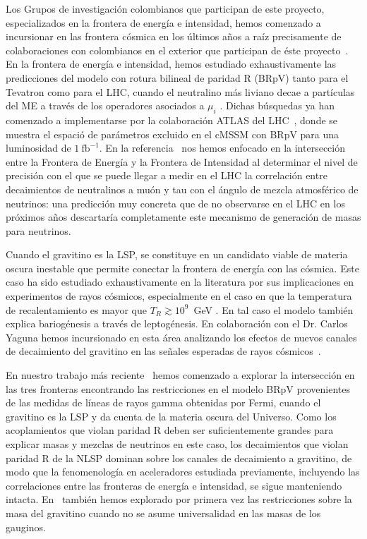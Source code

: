 Los Grupos de investigación colombianos que participan de este
proyecto, especializados en la frontera de energía e intensidad,
hemos comenzado a incursionar en las frontera cósmica en los últimos
años a raíz precisamente de colaboraciones con colombianos en el
exterior que participan de éste
proyecto~\cite{Sierra:2008wj,Sierra:2009zq,Choi:2010jt}. En la
frontera de energía e intensidad, hemos estudiado exhaustivamente las
predicciones del modelo con rotura bilineal de paridad R (BRpV) tanto
para el Tevatron como para el LHC, cuando el neutralino más liviano
decae a partículas del ME a través de los operadores asociados a
$\mu_i$
\cite{Magro:2003zb,deCampos:2005ri,deCampos:2007bn,deCampos:2008ic,deCampos:2008re,DeCampos:2010yu}. Dichas
búsquedas ya han comenzado a implementarse por la colaboración ATLAS
del LHC~\cite{:2011iu}, donde se muestra el espació de parámetros
excluido en el cMSSM con BRpV para una luminosidad de $1\
\text{fb}^{-1}$.  En la referencia~\cite{DeCampos:2010yu} nos hemos
enfocado en la intersección entre la Frontera de Energía y la Frontera
de Intensidad al determinar el nivel de precisión con el que se puede
llegar a medir en el LHC la correlación entre decaimientos de
neutralinos a muón y tau con el ángulo de mezcla atmosférico de
neutrinos: una predicción muy concreta que de no observarse en el LHC
en los próximos años descartaría completamente este mecanismo de
generación de masas para neutrinos.

Cuando el gravitino es la LSP, se constituye en un candidato viable de
materia oscura inestable que permite conectar la frontera de energía
con las cósmica. Este caso ha sido estudiado exhaustivamente en la
literatura por sus implicaciones en experimentos de rayos cósmicos,
especialmente en el caso en que la temperatura de recalentamiento es
mayor que $T_R\gtrsim 10^9$~GeV
\cite{Takayama:2000uz,Buchmuller:2007ui,Bertone:2007aw,Ibarra:2007wg,Ishiwata:2008cu,Covi:2008jy,Ibarra:2008qg}.
En tal caso el modelo también explica bariogénesis a través de
leptogénesis. En colaboración con el Dr. Carlos Yaguna hemos
incursionado en esta área analizando los efectos de nuevos canales de
decaimiento del gravitino en las señales esperadas de rayos
cósmicos~\cite{Choi:2010jt}.

En nuestro trabajo más reciente~\cite{Restrepo:2011rj} hemos comenzado a
explorar la intersección en las tres fronteras
encontrando las restricciones en el modelo BRpV provenientes de las
medidas de líneas de rayos gamma obtenidas por Fermi, cuando el
gravitino es la LSP y da cuenta de la
materia oscura del Universo. Como los acoplamientos que violan paridad
R deben ser suficientemente grandes para explicar masas y mezclas de
neutrinos en este caso, los decaimientos que violan paridad R de la
NLSP dominan
sobre los canales de decaimiento a gravitino, de modo que la
fenomenología en aceleradores estudiada previamente, incluyendo las correlaciones entre las
fronteras de energía e intensidad, se sigue
manteniendo intacta. En~\cite{Restrepo:2011rj} también hemos explorado
por primera vez las restricciones sobre la masa del gravitino cuando
no se asume universalidad en las masas de los gauginos.

